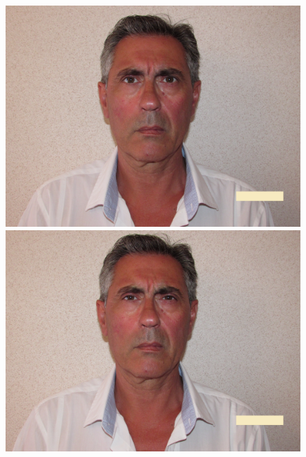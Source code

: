 \documentclass[output=paper]{langsci/langscibook}
\begin{document}
\begin{figure}
\includegraphics[height=.3\textheight]{figures/GIL-img6.jpg}

\includegraphics[height=.3\textheight]{figures/GIL-img7.jpg}


\end{figure}
\end{document}
